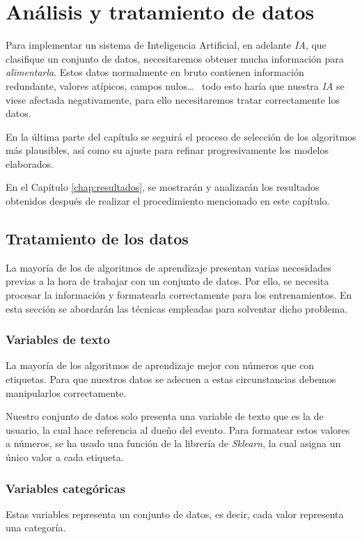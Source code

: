 \chapter{Análisis y tratamiento de datos}
\label{chap:ia}

Para implementar un sistema de Inteligencia Artificial, en adelante \textit{IA}, que clasifique un conjunto de datos, necesitaremos obtener mucha información para \textit{alimentarla}. Estos datos normalmente en bruto contienen información redundante, valores atípicos, campos nulos\dots~ todo esto haría que nuestra \textit{IA} se viese afectada negativamente, para ello necesitaremos tratar correctamente los datos.

En la última parte del capítulo se seguirá el proceso de selección de los algoritmos más plausibles, así como su ajuste para refinar progresivamente los modelos elaborados.

En el Capítulo \ref{chap:resultados}, se mostrarán y analizarán los resultados obtenidos después de realizar el procedimiento mencionado en este capítulo.

\section{Tratamiento de los datos}

La mayoría de los de algoritmos de aprendizaje presentan varias necesidades previas a la hora de trabajar con un conjunto de datos. Por ello, se necesita procesar la información y formatearla correctamente para los entrenamientos. 
En esta sección se abordarán las técnicas empleadas para solventar dicho problema.

\subsection{Variables de texto}

La mayoría de los algoritmos de aprendizaje mejor con números que con etiquetas. Para que nuestros datos se adecuen a estas circunstancias debemos manipularlos correctamente.


Nuestro conjunto de datos solo presenta una variable de texto que es la de usuario, la cual hace referencia al dueño del evento. Para formatear estos valores a números, se ha usado una función de la librería de \textit{Sklearn}, la cual asigna un único valor a cada etiqueta.
 \subsection{Variables categóricas}
 Estas variables representa un conjunto de datos, es decir, cada valor representa una categoría.
 
